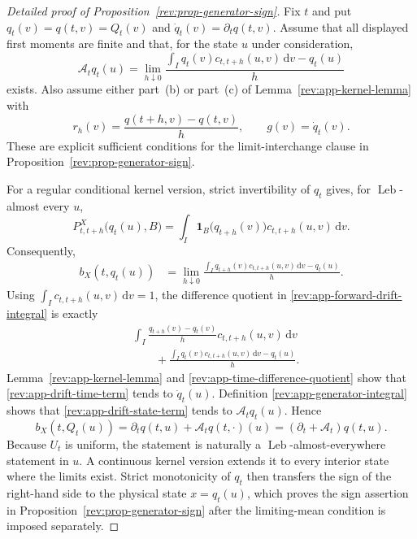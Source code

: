 \documentclass[11pt]{article}
\theoremstyle{remark}
\newcommand{\dd}{\,\mathrm d}
\newcommand{\one}{\mathbf 1}
\newcommand{\Leb}{\operatorname{Leb}}
\begin{document}
\begin{proof}[Detailed proof of Proposition~\ref{rev:prop-generator-sign}]
Fix $t$ and put $q_t(v)=q(t,v)=Q_t(v)$ and
$\dot q_t(v)=\partial_tq(t,v)$.  Assume that all displayed first moments are
finite and that, for the state $u$ under consideration,
\begin{equation}
\mathcal A_tq_t(u)
=\lim_{h\downarrow0}
\frac{\int_Iq_t(v)c_{t,t+h}(u,v)\dd v-q_t(u)}{h}
\label{rev:app-generator-integral}
\end{equation}
exists.  Also assume either part~(b) or part~(c) of
Lemma~\ref{rev:app-kernel-lemma} with
\begin{equation}
r_h(v)=\frac{q(t+h,v)-q(t,v)}{h},
\qquad g(v)=\dot q_t(v).
\label{rev:app-time-difference-quotient}
\end{equation}
These are explicit sufficient conditions for the limit-interchange clause in
Proposition~\ref{rev:prop-generator-sign}.

For a regular conditional kernel version, strict invertibility of $q_t$ gives,
for $\Leb$-almost every $u$,
\begin{equation}
P^X_{t,t+h}\bigl(q_t(u),B\bigr)
=\int_I\one_{B}\bigl(q_{t+h}(v)\bigr)c_{t,t+h}(u,v)\dd v.
\label{rev:app-pushforward-kernel}
\end{equation}
Consequently,
\begin{align}
b_X(t,q_t(u))
&=\lim_{h\downarrow0}
\frac{\int_Iq_{t+h}(v)c_{t,t+h}(u,v)\dd v-q_t(u)}{h}.
\label{rev:app-forward-drift-integral}
\end{align}
Using $\int_Ic_{t,t+h}(u,v)\dd v=1$, the difference quotient in
\eqref{rev:app-forward-drift-integral} is exactly
\begin{align}
&\int_I
\frac{q_{t+h}(v)-q_t(v)}{h}c_{t,t+h}(u,v)\dd v
\label{rev:app-drift-time-term}\\
&\qquad+
\frac{\int_Iq_t(v)c_{t,t+h}(u,v)\dd v-q_t(u)}{h}.
\label{rev:app-drift-state-term}
\end{align}
Lemma~\ref{rev:app-kernel-lemma} and
\eqref{rev:app-time-difference-quotient} show that
\eqref{rev:app-drift-time-term} tends to $\dot q_t(u)$.  Definition
\eqref{rev:app-generator-integral} shows that
\eqref{rev:app-drift-state-term} tends to $\mathcal A_tq_t(u)$.  Hence
\begin{equation}
b_X(t,Q_t(u))
=\partial_tq(t,u)+\mathcal A_tq(t,\cdot)(u)
=(\partial_t+\mathcal A_t)q(t,u).
\label{rev:app-full-drift-identity}
\end{equation}
Because $U_t$ is uniform, the statement is naturally a
$\Leb$-almost-everywhere statement in $u$.  A continuous kernel version extends
it to every interior state where the limits exist.  Strict monotonicity of
$q_t$ then transfers the sign of the right-hand side to the physical state
$x=q_t(u)$, which proves the sign assertion in
Proposition~\ref{rev:prop-generator-sign} after the limiting-mean condition is
imposed separately.
\end{proof}
\end{document}
